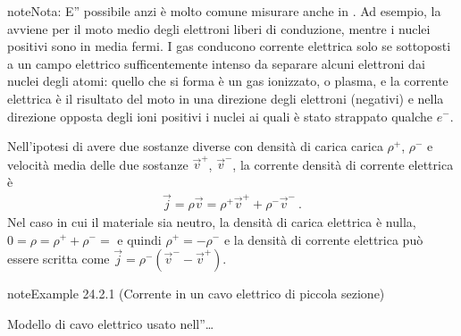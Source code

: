 \documentclass[letterpaper,10pt,italian]{jupyterBook}
\begin{document}
\begin{sphinxadmonition}{note}{Nota:}
\sphinxAtStartPar
E” possibile \sphinxhyphen{} anzi è molto comune \sphinxhyphen{} misurare  anche in . Ad esempio, la {\hyperref[\detokenize{ch/electromagnetism/electric-current:physics-hs-electromagnetism-electric-current-solids-conductor}]{}} avviene per il moto medio degli elettroni liberi di conduzione, mentre i nuclei positivi sono in media fermi. I gas conducono corrente elettrica solo se sottoposti a un campo elettrico sufficentemente intenso da separare alcuni elettroni dai nuclei degli atomi: quello che si forma è un gas ionizzato, o plasma, e la corrente elettrica è il risultato del moto in una direzione degli elettroni (negativi) e nella direzione opposta degli ioni positivi \sphinxhyphen{} i nuclei ai quali è stato strappato qualche \(e^-\).

\sphinxAtStartPar
Nell’ipotesi di avere due sostanze diverse con densità di carica carica \(\rho^+\), \(\rho^-\) e velocità media delle due sostanze \(\vec{v}^+\), \(\vec{v}^-\), la corrente densità di corrente elettrica è
\begin{equation*}
\begin{split}\vec{j} = \rho \vec{v} = \rho^+ \vec{v}^+ + \rho^- \vec{v}^- \ . \end{split}
\end{equation*}
\sphinxAtStartPar
Nel caso in cui il materiale sia neutro, la densità di carica elettrica è nulla, \(0 = \rho = \rho^+ + \rho^- =\) e quindi \(\rho^+ = - \rho^-\) e la densità di corrente elettrica può essere scritta come \(\vec{j} = \rho^- (\vec{v}^- - \vec{v}^+)\).
\end{sphinxadmonition}
\label{ch/electromagnetism/electric-current:electric-current-wire}
\begin{sphinxadmonition}{note}{Example 24.2.1 (Corrente in un cavo elettrico di piccola sezione)}



\sphinxAtStartPar
Modello di cavo elettrico usato nell”{\hyperref[\detokenize{ch/electromagnetism/circuits-electric:physics-hs-electromagnetism-circuits-electric}]{}}…
\end{sphinxadmonition}
\end{document}
